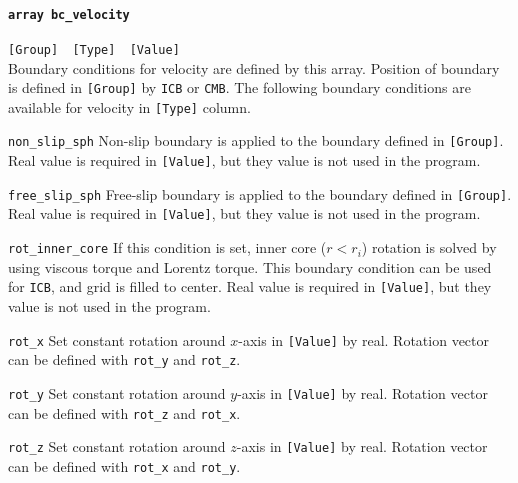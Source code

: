 \paragraph{\tt array bc\_velocity}
\label{href_t:bc_velocity}
\verb|[Group]  [Type]  [Value]| \\
Boundary conditions for velocity are defined by this array. Position of boundary is defined in \verb|[Group]| by {\tt ICB} or {\tt CMB}. The following boundary conditions are available for velocity in \verb|[Type]| column.
%
\begin{description}
\item{\tt non\_slip\_sph}	Non-slip boundary is applied to the boundary defined in \verb|[Group]|. Real value is required in \verb|[Value]|, but they value is not used in the program.
\item{\tt free\_slip\_sph}	Free-slip boundary is applied to the boundary defined in \verb|[Group]|. Real value is required in \verb|[Value]|, but they value is not used in the program.
\item{\tt rot\_inner\_core} If this condition is set, inner core ($r < r_{i}$) rotation is solved by using viscous torque and Lorentz torque. This boundary condition can be used for {\tt ICB}, and grid is filled to center. Real value is required in \verb|[Value]|, but they value is not used in the program.

\item{\tt rot\_x} Set constant rotation around $x$-axis in \verb|[Value]| by real. Rotation vector can be defined with {\tt rot\_y} and {\tt rot\_z}.
\item{\tt rot\_y} Set constant rotation around $y$-axis in \verb|[Value]| by real. Rotation vector can be defined with {\tt rot\_z} and {\tt rot\_x}.
\item{\tt rot\_z} Set constant rotation around $z$-axis in \verb|[Value]| by real. Rotation vector can be defined with {\tt rot\_x} and {\tt rot\_y}.
\end{description}
%

